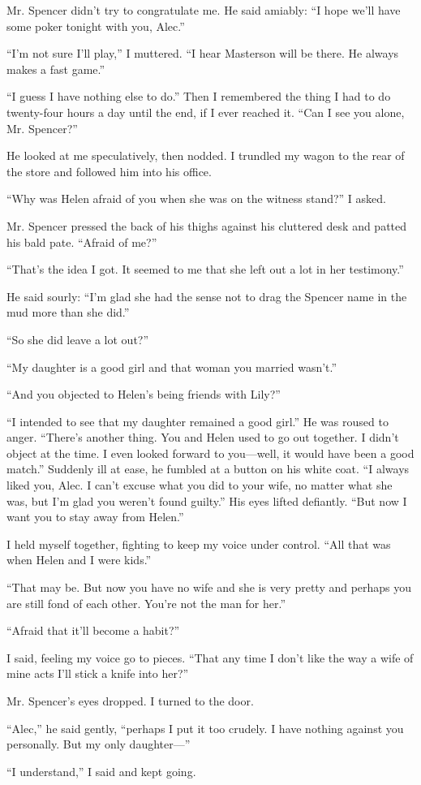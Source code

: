 \documentclass{novel}
\begin{document}
{Mr. Spencer didn’t try to congratulate me. He said amiably: “I hope we’ll have some poker tonight with you, Alec.”

“I’m not sure I’ll play,” I muttered. “I hear Masterson will be there. He always makes a fast game.”

“I guess I have nothing else to do.” Then I remembered the thing I had to do twenty-four hours a day until the end, if I ever reached it. “Can I see you alone, Mr. Spencer?”

He looked at me speculatively, then nodded. I trundled my wagon to the rear of the store and followed him into his office.

“Why was Helen afraid of you when she was on the witness stand?” I asked.

Mr. Spencer pressed the back of his thighs against his cluttered desk and patted his bald pate. “Afraid of me?”

“That’s the idea I got. It seemed to me that she left out a lot in her testimony.”

He said sourly: “I’m glad she had the sense not to drag the Spencer name in the mud more than she did.”

“So she did leave a lot out?”

“My daughter is a good girl and that woman you married wasn’t.”

“And you objected to Helen’s being friends with Lily?”

“I intended to see that my daughter remained a good girl.” He was roused to anger. “There’s another thing. You and Helen used to go out together. I didn’t object at the time. I even looked forward to you—well, it would have been a good match.” Suddenly ill at ease, he fumbled at a button on his white coat. “I always liked you, Alec. I can’t excuse what you did to your wife, no matter what she was, but I’m glad you weren’t found guilty.” His eyes lifted defiantly. “But now I want you to stay away from Helen.”

I held myself together, fighting to keep my voice under control. “All that was when Helen and I were kids.”

“That may be. But now you have no wife and she is very pretty and perhaps you are still fond of each other. You’re not the man for her.”

“Afraid that it’ll become a habit?”

I said, feeling my voice go to pieces. “That any time I don’t like the way a wife of mine acts I’ll stick a knife into her?”

Mr. Spencer’s eyes dropped. I turned to the door.

“Alec,” he said gently, “perhaps I put it too crudely. I have nothing against you personally. But my only daughter—”

“I understand,” I said and kept going.

}
\end{document}
